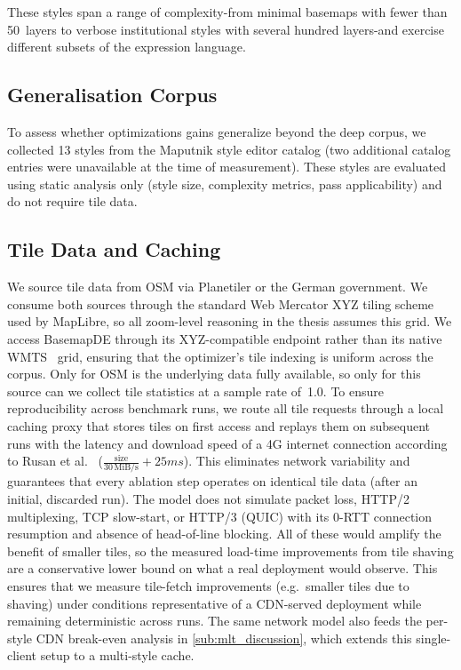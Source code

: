 {These styles span a range of complexity-from minimal basemaps with fewer than 50~layers to verbose institutional styles with several hundred layers-and exercise different subsets of the expression language.

\subsection{Generalisation Corpus}\label{sub:generalization_corpus}

To assess whether optimizations gains generalize beyond the deep corpus, we collected 13 styles from the Maputnik style editor catalog (two additional catalog entries were unavailable at the time of measurement).
These styles are evaluated using static analysis only (style size, complexity metrics, pass applicability) and do not require tile data.

\subsection{Tile Data and Caching}\label{sub:tile_data}

We source tile data from \ac{OSM} via Planetiler or the German government.
We consume both sources through the standard Web Mercator XYZ tiling scheme used by MapLibre, so all zoom-level reasoning in the thesis assumes this grid.
We access BasemapDE through its XYZ-compatible endpoint rather than its native \acs{WMTS}~\cite{masoOpenGISWebMap2010} grid, ensuring that the optimizer's tile indexing is uniform across the corpus.
Only for \ac{OSM} is the underlying data fully available, so only for this source can we collect tile statistics at a sample rate of~1.0.
To ensure reproducibility across benchmark runs, we route all tile requests through a local caching proxy that stores tiles on first access and replays them on subsequent runs with the latency and download speed of a 4G internet connection according to Rusan et al.~\cite{rusanAssessmentPacketLatency2015} ($\frac{\text{size}}{30\,\mathrm{MiB/s}} + 25ms$).
This eliminates network variability and guarantees that every ablation step operates on identical tile data (after an initial, discarded run).
The model does not simulate packet loss, HTTP/2 multiplexing, TCP slow-start, or HTTP/3 (QUIC) with its 0-RTT connection resumption and absence of head-of-line blocking.
All of these would amplify the benefit of smaller tiles, so the measured load-time improvements from tile shaving are a conservative lower bound on what a real deployment would observe.
This ensures that we measure tile-fetch improvements (e.g.\ smaller tiles due to shaving) under conditions representative of a \ac{CDN}-served deployment while remaining deterministic across runs.
The same network model also feeds the per-style \ac{CDN} break-even analysis in \cref{sub:mlt_discussion}, which extends this single-client setup to a multi-style cache.

}
